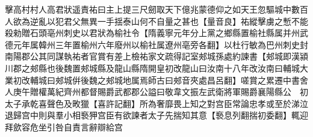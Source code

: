 擊高村村人高君狀遥責祐曰主上提三尺劒取天下億兆蒙德仰之如天王忽驅城中數百人欲為逆亂以犯君父無異一手揺泰山何不自量之甚也【量音良】祐縱擊虜之慙不能殺勑贈石頭亳州刺史以君狀為榆社令【隋義寧元年分上黨之鄉縣置榆社縣属并州武德元年属韓州三年置榆州六年廢州以榆社属遼州亳旁各翻】以杜行敏為巴州刺史封南陽郡公其同謀執祐者官賞有差上檢祐家文疏得記室郟城孫處約諫書【郟城即漢潁川郡之郟縣也後魏置郟城縣及龍山縣隋開皇初改龍山曰汝南十八年改汝南曰輔城大業初改輔城曰郟城倂後魏之郟城地属焉師古曰郟音夾處昌呂翻】嗟賞之累遷中書舍人庚午贈權萬紀齊州都督賜爵武都郡公謚曰敬韋文振左武衛將軍賜爵襄陽縣公　初太子承乾喜聲色及畋獵【喜許記翻】所為奢靡畏上知之對宫臣常論忠孝或至於涕泣退歸宫中則與羣小相䙝狎宫臣有欲諫者太子先揣知其意【䙝息列翻揣初委翻】輒迎拜歛容危坐引咎自責言辭辯給宫